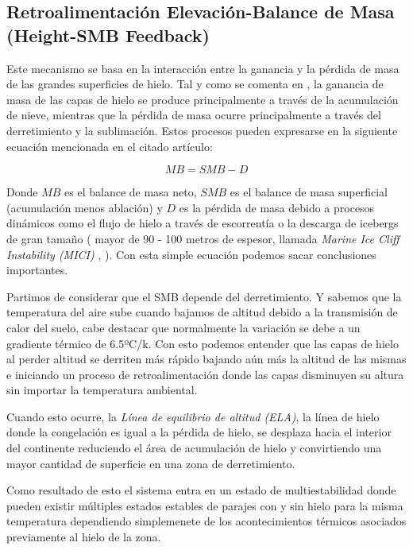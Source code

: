\documentclass[12pt,a4paper,chapterprefix=false,headings=twolinechapter]{scrreprt}
\begin{document}
\subsection{Retroalimentación Elevación-Balance de Masa (Height-SMB Feedback)}

Este mecanismo se basa en la interacción entre la ganancia y la pérdida de masa de las grandes superficies de hielo. Tal y como se comenta en \cite{Lenaerts2019}, la ganancia de masa de las capas de hielo se 
produce principalmente a través de la acumulación de nieve, mientras que la pérdida de masa ocurre principalmente a través del derretimiento y la sublimación. Estos procesos pueden expresarse en la siguiente ecuación
mencionada en el citado artículo:

\begin{equation}
    MB = SMB - D
\end{equation}

Donde $MB$ es el balance de masa neto, $SMB$ es el balance de masa superficial (acumulación menos ablación) y $D$ es la pérdida de masa debido a procesos dinámicos como el flujo de hielo a través de escorrentía o la descarga de icebergs
de gran tamaño ( mayor de 90 - 100 metros de espesor, llamada \textit{Marine Ice Cliff Instability (MICI)} , \cite{DeConto2016}). Con esta simple ecuación podemos sacar conclusiones importantes.

\vspace{0.5cm}

 Partimos de considerar que el SMB depende del derretimiento. Y sabemos que la temperatura del aire sube cuando bajamos de altitud debido a la transmisión de calor del suelo, cabe destacar que normalmente la variación se debe a un 
 gradiente térmico de 6.5ºC/k. Con esto podemos entender que las capas de hielo al perder altitud se derriten más rápido bajando aún más la altitud de las mismas e iniciando un proceso de retroalimentación donde las capas disminuyen su altura sin importar la temperatura ambiental.

 Cuando esto ocurre, la \textit{Línea de equilibrio de altitud (ELA)}, la línea de hielo donde la congelación es igual a la pérdida de hielo, se desplaza hacia el interior del continente reduciendo el área de acumulación de hielo y convirtiendo una 
 mayor cantidad de superficie en una zona de derretimiento.

 Como resultado de esto el sistema entra en un estado de multiestabilidad donde pueden existir múltiples estados estables de parajes con y sin hielo para la misma temperatura dependiendo simplemenete de los acontecimientos térmicos asociados
 previamente al hielo de la zona.
\end{document}

